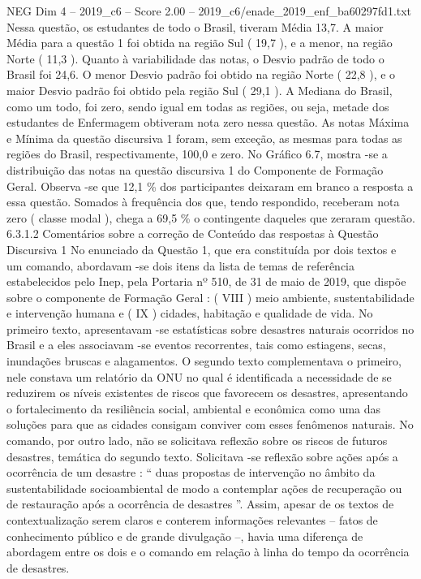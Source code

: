 \begin{textsample}{NEG Dim 4 – 2019\_c6 – Score 2.00 – 2019\_c6/enade\_2019\_enf\_ba60297fd1.txt}
Nessa questão, os estudantes de todo o Brasil, tiveram Média 13,7.
A maior Média para a questão 1 foi obtida na região Sul ( 19,7 ), e a menor, na região Norte ( 11,3 ).
Quanto à variabilidade das notas, o Desvio padrão de todo o Brasil foi 24,6.
O menor Desvio padrão foi obtido na região Norte ( 22,8 ), e o maior Desvio padrão foi obtido pela região Sul ( 29,1 ).
A Mediana do Brasil, como um todo, foi zero, sendo igual em todas as regiões, ou seja, metade dos estudantes de Enfermagem obtiveram nota zero nessa questão.
As notas Máxima e Mínima da questão discursiva 1 foram, sem exceção, as mesmas para todas as regiões do Brasil, respectivamente, 100,0 e zero.
No Gráfico 6.7, mostra -se a distribuição das notas na questão discursiva 1 do Componente de Formação Geral.
Observa -se que 12,1 \% dos participantes deixaram em branco a resposta a essa questão.
Somados à frequência dos que, tendo respondido, receberam nota zero ( classe modal ), chega a 69,5 \% o contingente daqueles que zeraram questão. 6.3.1.2 Comentários sobre a correção de Conteúdo das respostas à Questão Discursiva 1 No enunciado da Questão 1, que era constituída por dois textos e um comando, abordavam -se dois itens da lista de temas de referência estabelecidos pelo Inep, pela Portaria nº 510, de 31 de maio de 2019, que dispõe sobre o componente de Formação Geral : ( VIII ) meio ambiente, sustentabilidade e intervenção humana e ( IX ) cidades, habitação e qualidade de vida.
No primeiro texto, apresentavam -se estatísticas sobre desastres naturais ocorridos no Brasil e a eles associavam -se eventos recorrentes, tais como estiagens, secas, inundações bruscas e alagamentos.
O segundo texto complementava o primeiro, nele constava um relatório da ONU no qual é identificada a necessidade de se reduzirem os níveis existentes de riscos que favorecem os desastres, apresentando o fortalecimento da resiliência social, ambiental e econômica como uma das soluções para que as cidades consigam conviver com esses fenômenos naturais.
No comando, por outro lado, não se solicitava reflexão sobre os riscos de futuros desastres, temática do segundo texto.
Solicitava -se reflexão sobre ações após a ocorrência de um desastre : “ duas propostas de intervenção no âmbito da sustentabilidade socioambiental de modo a contemplar ações de recuperação ou de restauração após a ocorrência de desastres ”.
Assim, apesar de os textos de contextualização serem claros e conterem informações relevantes – fatos de conhecimento público e de grande divulgação –, havia uma diferença de abordagem entre os dois e o comando em relação à linha do tempo da ocorrência de desastres.

\end{textsample}
